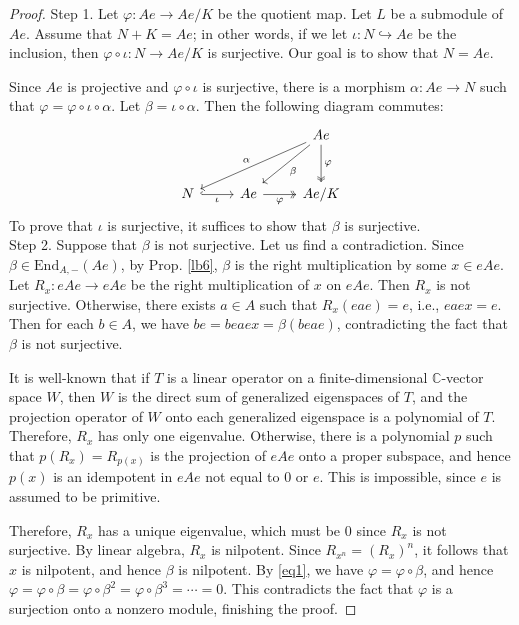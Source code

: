 \documentclass[11pt,b5paper,notitlepage]{article}
\theoremstyle{definition}
\theoremstyle{plain}
\newcommand{\End}{\mathrm{End}} %
\newcommand{\Cbb}{\mathbb C}
\numberwithin{equation}{section}
\begin{document}
\begin{proof}
Step 1. Let $\varphi:Ae\rightarrow Ae/K$ be the quotient map. Let $L$ be a submodule of $Ae$. Assume that $N+K=Ae$; in other words, if we let $\iota:N\hookrightarrow Ae$ be the inclusion, then $\varphi\circ\iota:N\rightarrow Ae/K$ is surjective. Our goal is to show that $N=Ae$.

Since $Ae$ is projective and $\varphi\circ\iota$ is surjective, there is a morphism $\alpha:Ae\rightarrow N$ such that $\varphi=\varphi\circ\iota\circ\alpha$. Let $\beta=\iota\circ\alpha$. Then the following diagram commutes:
\begin{equation}\label{eq1}
\begin{tikzcd}[row sep=large]
                  &             & Ae \arrow[lld,"\alpha"'] \arrow[ld,"\beta"] \arrow[d, two heads, "\varphi"] \\
N \arrow[r, hook,"\iota"'] & Ae \arrow[r,"\varphi"', two heads] & Ae/K                               
\end{tikzcd}
\end{equation}
To prove that $\iota$ is surjective, it suffices to show that $\beta$ is surjective.\\[-1ex]

Step 2. Suppose that $\beta$ is not surjective. Let us find a contradiction. Since $\beta\in\End_{A,-}(Ae)$, by Prop. \ref{lb6}, $\beta$ is the right multiplication by some $x\in eAe$. Let $R_x:eAe\rightarrow eAe$ be the right multiplication of $x$ on $eAe$. Then $R_x$ is not surjective. Otherwise, there exists $a\in A$ such that $R_x(eae)=e$, i.e., $eaex=e$. Then for each $b\in A$, we have $be=beaex=\beta(beae)$, contradicting the fact that $\beta$ is not surjective.

It is well-known that if $T$ is a linear operator on a finite-dimensional $\Cbb$-vector space $W$, then $W$ is the direct sum of generalized eigenspaces of $T$, and the projection operator of $W$ onto each generalized eigenspace is a polynomial of $T$. Therefore, $R_x$ has only one eigenvalue. Otherwise, there is a polynomial $p$ such that $p(R_x)=R_{p(x)}$ is the projection of $eAe$ onto a proper subspace, and hence $p(x)$ is an idempotent in $eAe$ not equal to $0$ or $e$. This is impossible, since $e$ is assumed to be primitive.

Therefore, $R_x$ has a unique eigenvalue, which must be $0$ since $R_x$ is not surjective. By linear algebra, $R_x$ is nilpotent. Since $R_{x^n}=(R_x)^n$, it follows that $x$ is nilpotent, and hence $\beta$ is nilpotent. By \eqref{eq1}, we have $\varphi=\varphi\circ\beta$, and hence $\varphi=\varphi\circ\beta=\varphi\circ\beta^2=\varphi\circ\beta^3=\cdots=0$. This contradicts the fact that $\varphi$ is a surjection onto a nonzero module, finishing the proof.
\end{proof}
\end{document}
